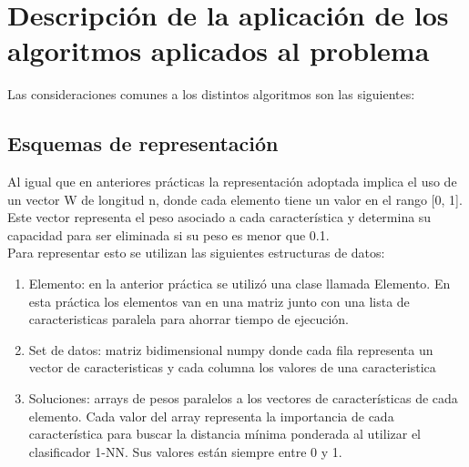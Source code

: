 \documentclass[12pt, spanish]{article}
\begin{document}
\section{Descripción de la aplicación de los algoritmos aplicados al problema }

Las consideraciones comunes a los distintos algoritmos son las siguientes: 

\subsection{Esquemas de representación}
Al igual que en anteriores prácticas la representación adoptada implica el uso de un vector W de longitud n, donde cada elemento tiene un valor en el rango [0, 1]. Este vector representa el peso asociado a cada característica y determina su capacidad para ser eliminada si su peso es menor que 0.1. \\
\newline 
Para representar esto se utilizan las siguientes estructuras de datos: 
\begin{enumerate}[label=-]
  \item Elemento: en la anterior práctica se utilizó una clase llamada Elemento. En esta práctica los elementos van en una matriz junto con una lista de caracteristicas paralela para ahorrar tiempo de ejecución.
  \item Set de datos: matriz bidimensional numpy donde cada fila representa un vector de caracteristicas y cada columna los valores de una caracteristica 
  \item  Soluciones: arrays de pesos paralelos a los vectores de características de cada elemento. Cada valor del array representa la importancia de cada característica para buscar la distancia mínima ponderada al utilizar el clasificador 1-NN. Sus valores están siempre entre 0 y 1. 
\end{enumerate}
\end{document}
